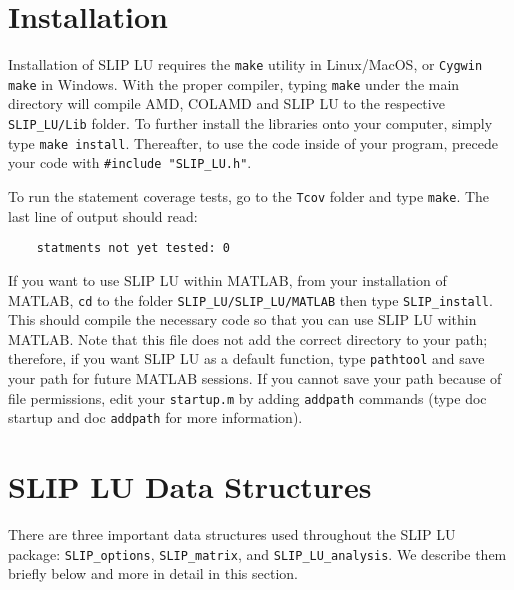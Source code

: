 \documentclass[12pt]{article}
\theoremstyle{definition}
\begin{document}
\section{Installation} \label{s:install}

Installation of SLIP LU requires the \verb|make| utility in Linux/MacOS, or
\verb|Cygwin make| in Windows. With the proper compiler, typing \verb|make|
under the main directory will compile AMD, COLAMD and SLIP LU to the respective
\verb'SLIP_LU/Lib' folder. To further install the libraries onto your computer,
simply type \verb|make install|.  Thereafter, to use the code inside of your
program, precede your code with \verb|#include "SLIP_LU.h"|.

To run the statement coverage tests, go to the \verb'Tcov' folder and
type \verb'make'.  The last line of output should read:

\begin{verbatim}
    statments not yet tested: 0
\end{verbatim}

If you want to use SLIP LU within MATLAB, from your installation of MATLAB,
\verb|cd| to the folder \verb|SLIP_LU/SLIP_LU/MATLAB| then type
\verb|SLIP_install|. This should compile the necessary code so that you can use
SLIP LU within MATLAB. Note that this file does not add the correct directory
to your path; therefore, if you want SLIP LU as a default function, type
\verb|pathtool| and save your path for future MATLAB sessions. If you cannot
save your path because of file permissions, edit your \verb|startup.m| by
adding \verb|addpath| commands (type doc startup and doc \verb|addpath| for
more information).

\section{SLIP LU Data Structures} \label{s:Structures}

There are three important data structures used throughout the SLIP LU package:
\verb|SLIP_options|, \verb|SLIP_matrix|, and
\verb|SLIP_LU_analysis|. We describe them briefly below and more in detail in
this section.
\end{document}

